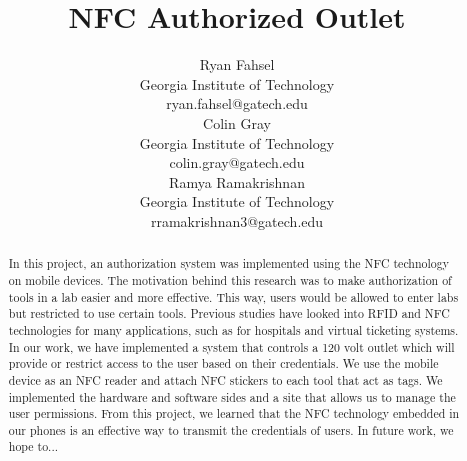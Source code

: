 \documentclass{sigchi}
\begin{document}
\title{NFC Authorized Outlet}

\author{
  \alignauthor Ryan Fahsel\\
    \affaddr Georgia Institute of Technology\\
    \email ryan.fahsel@gatech.edu\\
  \alignauthor Colin Gray\\
    \affaddr Georgia Institute of Technology\\
    \email colin.gray@gatech.edu\\
  \alignauthor Ramya Ramakrishnan\\
    \affaddr Georgia Institute of Technology\\
    \email rramakrishnan3@gatech.edu\\
}

\maketitle

\begin{abstract}
In this project, an authorization system was implemented using the NFC technology on mobile devices. The motivation behind this research was to make authorization of tools in a lab easier and more effective. This way, users would be allowed to enter labs but restricted to use certain tools. Previous studies have looked into RFID and NFC technologies for many applications, such as for hospitals and virtual ticketing systems. In our work, we have implemented a system that controls a 120 volt outlet which will provide or restrict access to the user based on their credentials. We use the mobile device as an NFC reader and attach NFC stickers to each tool that act as tags. We implemented the hardware and software sides and a site that allows us to manage the user permissions. From this project, we learned that the NFC technology embedded in our phones is an effective way to transmit the credentials of users. In future work, we hope to...
\end{abstract}

\end{document}
